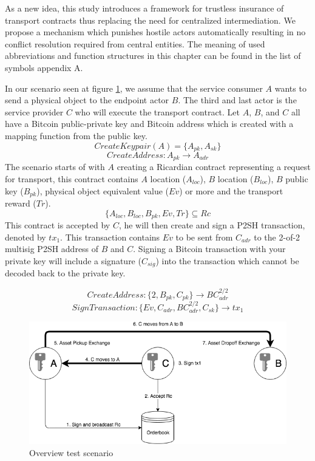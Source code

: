 As a new idea, this study introduces a framework for trustless insurance of transport contracts thus replacing the need for centralized intermediation. We propose a mechanism which punishes hostile actors automatically resulting in no conflict resolution required from central entities. The meaning of used abbreviations and function structures in this chapter can be found in the list of symbols appendix A.\par
In our scenario seen at figure \ref{fig:1 main overview}, we assume that the service consumer $A$ wants to send a physical object to the endpoint actor $B$. The third and last actor is the service provider $C$ who will execute the transport contract. Let $A$, $B$, and $C$ all have a Bitcoin public-private key and Bitcoin address which is created with a mapping function from the public key.
\[CreateKeypair(A) = \{A_{pk}, A_{sk}\}\]
\[CreateAddress \colon A_{pk} \rightarrow A_{adr}\]
The scenario starts of with $A$ creating a Ricardian contract representing a request for transport, this contract contains $A$ location ($A_{loc}$), $B$ location ($B_{loc}$), $B$ public key ($B_{pk}$), physical object equivalent value ($Ev$) or more and the transport reward ($Tr$).
\[\{A_{loc}, B_{loc}, B_{pk}, Ev, Tr\} \subseteq Rc\]
This contract is accepted by $C$, he will then create and sign a P2SH transaction, denoted by $tx_1$. This transaction contains $Ev$ to be sent from $C_{adr}$ to the 2-of-2 multisig P2SH address of $B$ and $C$. Signing a Bitcoin transaction with your private key will include a signature ($C_{sig}$) into the transaction which cannot be decoded back to the private key.

\[CreateAddress \colon \{2, B_{pk}, C_{pk}\} \rightarrow BC_{adr}^{2/2}\]
\[SignTransaction \colon \{Ev, C_{adr}, BC_{adr}^{2/2}, C_{sk}\} \rightarrow tx_1\]

\begin{figure}[h]
\centering
\includegraphics[width=1\textwidth]{images/main.png}
\caption{Overview test scenario}
\label{fig:1 main overview}
\end{figure}

